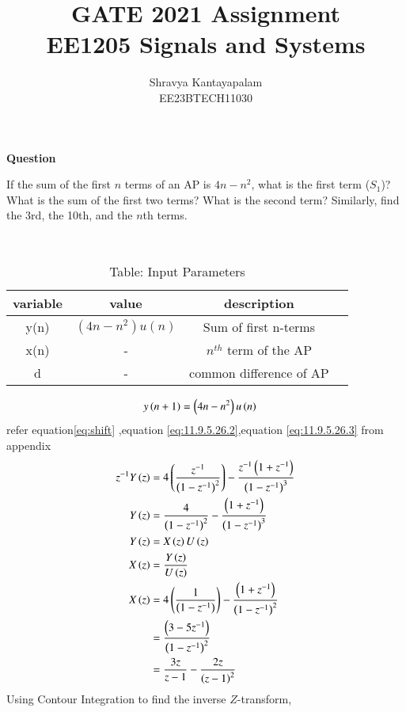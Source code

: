 \documentclass[a4,12pt,onecolumn]{IEEEtran}
\begin{document}
\title{
\Huge\textbf{ GATE 2021 Assignment}\\
\Huge\textbf{EE1205} Signals and Systems\\
}
\author{Shravya Kantayapalam\\ EE23BTECH11030}
\maketitle
\textbf{Question} 

 If the sum of the first $ n $ terms of an AP is $4n - n^2$, what is the first term ($ S_1 $)? What is the sum of the first two terms? What is the second term? Similarly, find the 3rd, the 10th, and the $n$th terms.
 
\solution\\
\begin{table}[ht!]
\begin{center}
\begin{tabular}{|c|c|c|c|}
   \hline
   variable&value&description\\
   \hline 
   y(n)&$(4n-n^2)u(n)$& Sum of first n-terms\\
   \hline
   x(n)&-&$n^{th}$ term of the AP\\
   \hline 
   d&-&common difference of AP\\
   \hline
\end{tabular}
\caption{Table: Input Parameters}
\end{center}
\end{table}
\begin{align}
y\left(n+1\right)&=\left(4n-n^2\right)u\left(n\right)
\end{align}
refer equation\eqref{eq:shift} ,equation \eqref{eq:11.9.5.26.2},equation \eqref{eq:11.9.5.26.3} from appendix
\begin{align}
z^{-1}Y\left(z\right) &=4\left(\frac{z^{-1}}{\left(1-z^{-1}\right)^2}\right)-\frac{z^{-1}\left(1+z^{-1}\right)}{\left(1-z^{-1}\right)^3}\\
Y\left(z\right) &=\frac{4}{\left(1-z^{-1}\right)^2}-\frac{\left(1+z^{-1}\right)}{\left(1-z^{-1}\right)^3}\\
Y\left(z\right)&=X\left(z\right)U\left(z\right)\\
X\left(z\right)&=\frac{Y\left(z\right)}{U\left(z\right)}\\
X\left(z\right)&=4\left(\frac{1}{\left(1-z^{-1}\right)}\right)-\frac{\left(1+z^{-1}\right)}{\left(1-z^{-1}\right)^2}\\
&=\frac{\left(3-5z^{-1}\right)}{\left(1-z^{-1}\right)^2}\\
&=\frac{3z}{z-1}-\frac{2z}{\left(z-1\right)^2}
\end{align}
Using Contour Integration to find the inverse $Z$-transform,
\end{document}
